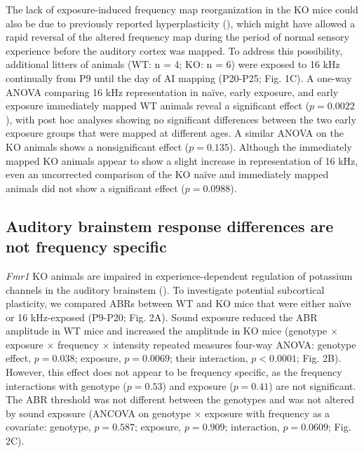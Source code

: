 \begin{figure}[p]
\begin{changemargin}{1in}{1in}
	\end{changemargin}
\end{figure}


The lack of exposure-induced frequency map reorganization in the KO mice could also be due to previously reported hyperplasticity (\cite{Dolen2007}), which might have allowed a rapid reversal of the altered frequency map during the period of normal sensory experience before the auditory cortex was mapped. To address this possibility, additional litters of animals (WT: n = 4; KO: n = 6) were exposed to 16 kHz continually from P9 until the day of AI mapping (P20-P25; Fig. 1C). A one-way ANOVA comparing 16 kHz representation in na\"ive, early exposure, and early exposure immediately mapped WT animals reveal a significant effect ($p=0.0022$), with post hoc analyses showing no significant differences between the two early exposure groups that were mapped at different ages. A similar ANOVA on the KO animals shows a nonsignificant effect ($p=0.135$). Although the immediately mapped KO animals appear to show a slight increase in representation of 16 kHz, even an uncorrected comparison of the KO na\"ive and immediately mapped animals did not show a significant effect ($p=0.0988$).

\subsection{Auditory brainstem response differences are not frequency specific}

\textit{Fmr1} KO animals are impaired in experience-dependent regulation of potassium channels in the auditory brainstem (\cite{Strumbos2010}). To investigate potential subcortical plasticity, we compared ABRs between WT and KO mice that were either na\"ive or 16 kHz-exposed (P9-P20; Fig. 2A). Sound exposure reduced the ABR amplitude in WT mice and increased the amplitude in KO mice (genotype $\times$ exposure $\times$ frequency $\times$ intensity repeated measures four-way ANOVA: genotype effect, $p=0.038$; exposure, $p=0.0069$; their interaction, $p<0.0001$; Fig. 2B). However, this effect does not appear to be frequency specific, as the frequency interactions with genotype ($p=0.53$) and exposure ($p=0.41$) are not significant. The ABR threshold was not different between the genotypes and was not altered by sound exposure (ANCOVA on genotype $\times$ exposure with frequency as a covariate: genotype, $p=0.587$; exposure, $p=0.909$; interaction, $p=0.0609$; Fig. 2C).


